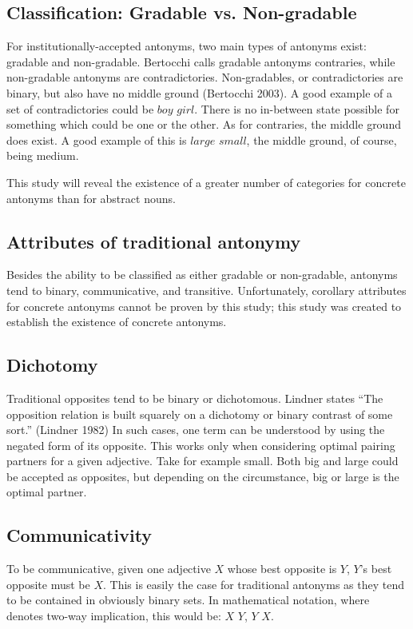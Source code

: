 \subsection {Classification: Gradable vs. Non-gradable} For institutionally-accepted antonyms, two main types of antonyms exist: gradable and non-gradable. Bertocchi calls gradable antonyms contraries, while non-gradable antonyms are contradictories.   Non-gradables, or contradictories are binary, but also have no middle ground (Bertocchi 2003).  A good example of a set of contradictories could be $boy$ \opp $girl$.  There is no in-between state possible for something which could be one or the other.  As for contraries, the middle ground does exist.  A good example of this is $large$ \opp $small$, the middle ground, of course, being medium.  

This study will reveal the existence of a greater number of categories for concrete antonyms than for abstract nouns. 

\subsection {Attributes of traditional antonymy} Besides the ability to be classified as either gradable or non-gradable, antonyms tend to binary, communicative, and transitive.  Unfortunately, corollary attributes for concrete antonyms cannot be proven by this study; this study was created to establish the existence of concrete antonyms.

\subsection {Dichotomy} Traditional opposites tend to be binary or dichotomous.  Lindner states ``The opposition relation is built squarely on a dichotomy or binary contrast of some sort.'' (Lindner 1982) In such cases, one term can be understood by using the negated form of its opposite.  This works only when considering optimal pairing partners for a given adjective.  Take for example small.  Both big and large could be accepted as opposites, but depending on the circumstance, big or large is the optimal partner.

\subsection {Communicativity} To be communicative, given one adjective $X$ whose best opposite is $Y$, $Y$’s best opposite must be $X$.  This is easily the case for traditional antonyms as they tend to be contained in obviously binary sets. In mathematical notation, where  denotes two-way implication, this would be: $X$ \opp $Y$, $Y$ \opp $X$.

